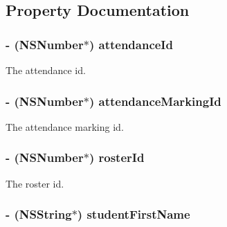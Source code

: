 \subsection{\-Property \-Documentation}
\hypertarget{interface_attendance_a47331d4a3bf6a66898af099cf7e8ceb3}{
\subsubsection[{attendance\-Id}]{\setlength{\rightskip}{0pt plus 5cm}-\/ (\-N\-S\-Number$\ast$) {\bf attendance\-Id}}}\label{interface_attendance_a47331d4a3bf6a66898af099cf7e8ceb3}
\-The attendance id. \hypertarget{interface_attendance_a2a250e9bc55299c5f2c4936f1346a396}{
\subsubsection[{attendance\-Marking\-Id}]{\setlength{\rightskip}{0pt plus 5cm}-\/ (\-N\-S\-Number$\ast$) {\bf attendance\-Marking\-Id}}}\label{interface_attendance_a2a250e9bc55299c5f2c4936f1346a396}
\-The attendance marking id. \hypertarget{interface_attendance_abd800fad3cefbc7a28865fdbf9841ce5}{
\subsubsection[{roster\-Id}]{\setlength{\rightskip}{0pt plus 5cm}-\/ (\-N\-S\-Number$\ast$) {\bf roster\-Id}}}\label{interface_attendance_abd800fad3cefbc7a28865fdbf9841ce5}
\-The roster id. \hypertarget{interface_attendance_ac19139347042d483a23013202a923ff8}{
\subsubsection[{student\-First\-Name}]{\setlength{\rightskip}{0pt plus 5cm}-\/ (\-N\-S\-String$\ast$) {\bf student\-First\-Name}}}\label{interface_attendance_ac19139347042d483a23013202a923ff8}
